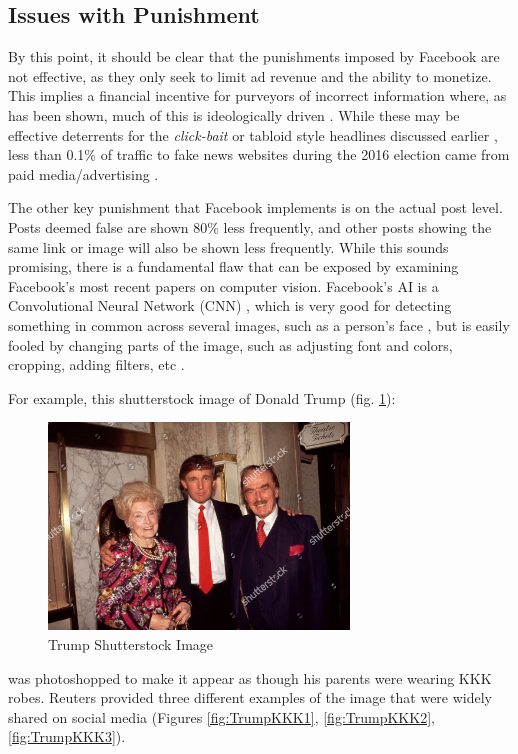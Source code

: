 \documentclass[NETN,manuscript]{stjour-new}
\begin{document}
\subsection{Issues with Punishment}
By this point, it should be clear that the punishments imposed by Facebook are not effective, as they only seek to limit ad revenue and the ability to monetize. This implies a financial incentive for purveyors of incorrect information where, as has been shown, much of this is ideologically driven \citep{allcott2017social}. While these may be effective deterrents for the \textit{click-bait} or tabloid style headlines discussed earlier  \citep{chen2015misleading}, less than 0.1\% of traffic to fake news websites during the 2016 election came from paid media/advertising \citep{albright2016election2016}. 

The other key punishment that Facebook implements is on the actual post level. Posts deemed false are shown 80\% less frequently, and other posts showing the same link or image will also be shown less frequently. While this sounds promising, there is a fundamental flaw that can be exposed by examining Facebook's most recent papers on computer vision. Facebook's AI is a Convolutional Neural Network (CNN) \citep{carion2020end}, which is very good for detecting something in common across several images, such as a person's face \citep{kalinovskii2015compact}, but is easily fooled by changing parts of the image, such as adjusting font and colors, cropping, adding filters, etc \citep{sumbaly2020using}.

For example, this shutterstock image of Donald Trump (fig. \ref{fig:Trump Shutterstock Image}): 
 \begin{figure}[htp]
    \centering
    \includegraphics[width=8cm]{trumpkkk0.jpg}
    \caption{Trump Shutterstock Image}
    \label{fig:Trump Shutterstock Image}
\end{figure}

was photoshopped to make it appear as though his parents were wearing KKK robes. Reuters provided three different examples of the image that were widely shared on social media \citep{reuters2020trump} (Figures \ref{fig:TrumpKKK1}, \ref{fig:TrumpKKK2}, \ref{fig:TrumpKKK3}).
\end{document}
